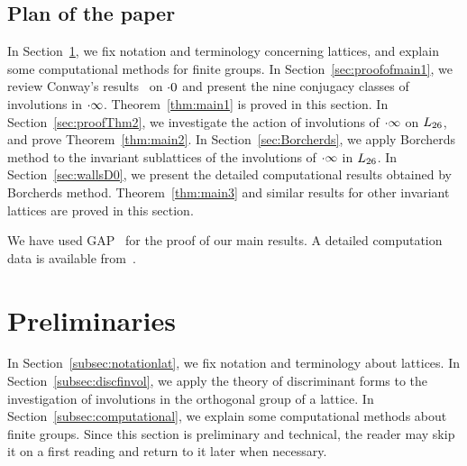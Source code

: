 \documentclass{amsart} %
\begin{document}
\subsection{Plan of the paper}\label{subsec:plan}
%
In Section~\ref{sec:prelim},
we fix notation and  terminology concerning  lattices, 
and explain some  computational methods 
for finite groups.
In Section~\ref{sec:proofofmain1},
we review Conway's results~\cite[Chapter 10]{theCSbook} on $\cdot 0$
and present the nine conjugacy classes of involutions in $\cdot \infty$.
Theorem~\ref{thm:main1} is proved in this section.
In Section~\ref{sec:proofThm2},
we investigate the action of   involutions of $\cdot \infty$ on $L_{26}$,
and prove Theorem~\ref{thm:main2}.
In Section~\ref{sec:Borcherds},
we apply Borcherds method to the invariant sublattices  of the involutions 
of $\cdot \infty$ in $L_{26}$.
In Section~\ref{sec:wallsD0},
we present the detailed computational results obtained by
 Borcherds method.
 Theorem~\ref{thm:main3} and similar results for other invariant lattices are  proved in this section.
%
\par
We have used GAP~\cite{GAP4} 
for the proof of our main results.
A detailed computation data is available from~\cite{affConwayCompdata}.
%
\section{Preliminaries}\label{sec:prelim}
%
In Section~\ref{subsec:notationlat}, 
we fix notation and  terminology about lattices.
In Section~\ref{subsec:discfinvol},
we apply the theory of discriminant forms
to the investigation of involutions in the orthogonal group of a lattice.
In Section~\ref{subsec:computational},
we explain some  computational methods 
about finite groups.
Since this section is preliminary and technical, the reader may skip it on a first reading and return to it later when necessary.
%
%
\end{document}
